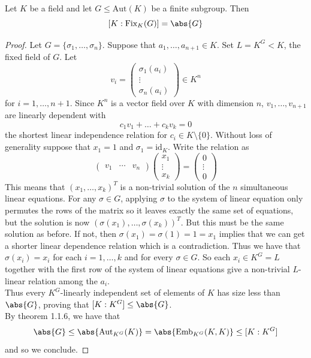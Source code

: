 \documentclass[a4paper]{article}
\begin{document}
\begin{prp}{}{}\\
Let $K$ be a field and let $G\leq\text{Aut}(K)$ be a finite subgroup. Then $$[K:\text{Fix}_K(G)]=\abs{G}$$ 
\begin{proof}
Let $G=\{\sigma_1,\dots,\sigma_n\}$. Suppose that $a_1,\dots,a_{n+1}\in K$. Set $L=K^G<K$, the fixed field of $G$. Let $$v_i=\begin{pmatrix}
\sigma_1(a_i)\\
\vdots\\
\sigma_n(a_i)
\end{pmatrix}\in K^n$$ for $i=1,\dots,n+1$. Since $K^n$ is a vector field over $K$ with dimension $n$, $v_1,\dots,v_{n+1}$ are linearly dependent with $$c_1v_1+\dots+c_kv_k=0$$ the shortest linear independence relation for $c_i\in K\setminus\{0\}$. Without loss of generality suppose that $x_1=1$ and $\sigma_1=\text{id}_K$. Write the relation as $$\begin{pmatrix}
v_1 & \cdots & v_n
\end{pmatrix}\begin{pmatrix}
x_1\\\vdots\\x_k
\end{pmatrix}=\begin{pmatrix}
0\\
\vdots\\
0
\end{pmatrix}$$ This means that $(x_1,\dots,x_k)^T$ is a non-trivial solution of the $n$ simultaneous linear equations. For any $\sigma\in G$, applying $\sigma$ to the system of linear equation only permutes the rows of the matrix so it leaves exactly the same set of equations, but the solution is now $(\sigma(x_1),\dots,\sigma(x_k))^T$. But this must be the same solution as before. If not, then $\sigma(x_1)=\sigma(1)=1=x_1$ implies that we can get a shorter linear dependence relation which is a contradiction. Thus we have that $\sigma(x_i)=x_i$ for each $i=1,\dots,k$ and for every $\sigma\in G$. So each $x_i\in K^G=L$ together with the first row of the system of linear equations give a non-trivial $L$-linear relation among the $a_i$. \\

Thus every $K^G$-linearly independent set of elements of $K$ has size less than $\abs{G}$, proving that $[K:K^G]\leq\abs{G}$. \\

By theorem 1.1.6, we have that $$\abs{G}\leq\abs{\text{Aut}_{K^G}(K)}=\abs{\text{Emb}_{K^G}(K,K)}\leq[K:K^G]$$ and so we conclude. 
\end{proof}
\end{prp}
\end{document}
